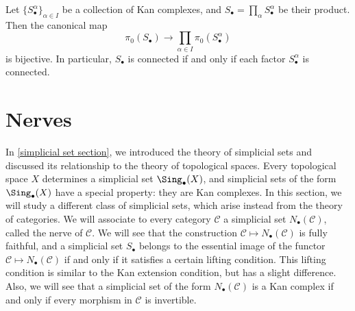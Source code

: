 \begin{corollary}\label{simplicial set Kan product and pi_0}
Let $\{S_\bullet^\alpha\}_{\alpha\in I}$ be a collection of Kan complexes, and $S_\bullet=\prod_\alpha S_\bullet^\alpha$ be their product. Then the canonical map
\[\pi_0(S_\bullet)\to\prod_{\alpha\in I}\pi_0(S_\bullet^\alpha)\]
is bijective. In particular, $S_\bullet$ is connected if and only if each factor $S_\bullet^\alpha$ is connected.
\end{corollary}
\section{Nerves}
In \autoref{simplicial set section}, we introduced the theory of simplicial sets and discussed its relationship to the theory of topological spaces. Every topological space $X$ determines a simplicial set $\Sing_\bullet(X)$, and simplicial sets of the form $\Sing_\bullet(X)$ have a special property: they are Kan complexes. In this section, we will study a different class of simplicial sets, which arise instead from the theory of categories. We will associate to every category $\mathcal{C}$ a simplicial set $N_\bullet(\mathcal{C})$, called the nerve of $\mathcal{C}$. We will see that the construction $\mathcal{C}\mapsto N_\bullet(\mathcal{C})$ is fully faithful, and a simplicial set $S_\bullet$ belongs to the essential image of the functor $\mathcal{C}\mapsto N_\bullet(\mathcal{C})$ if and only if it satisfies a certain lifting condition. This lifting condition is similar to the Kan extension condition, but has a slight difference. Also, we will see that a simplicial set of the form $N_\bullet(\mathcal{C})$ is a Kan complex if and only if every morphism in $\mathcal{C}$ is invertible.
